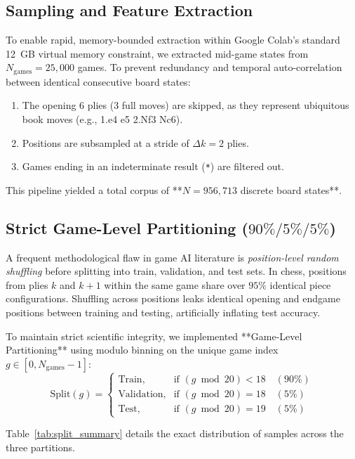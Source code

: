 \documentclass[10pt,journal,compsoc]{IEEEtran}
\begin{document}
\subsection{Sampling and Feature Extraction}
To enable rapid, memory-bounded extraction within Google Colab's standard 12~GB virtual memory constraint, we extracted mid-game states from $N_{\text{games}} = 25,000$ games. To prevent redundancy and temporal auto-correlation between identical consecutive board states:
\begin{enumerate}
    \item The opening 6 plies ($3$ full moves) are skipped, as they represent ubiquitous book moves (e.g., 1.e4 e5 2.Nf3 Nc6).
    \item Positions are subsampled at a stride of $\Delta k = 2$ plies.
    \item Games ending in an indeterminate result (\texttt{*}) are filtered out.
\end{enumerate}
This pipeline yielded a total corpus of **$N = 956,713$ discrete board states**.

\subsection{Strict Game-Level Partitioning ($90\% / 5\% / 5\%$)}
A frequent methodological flaw in game AI literature is \textit{position-level random shuffling} before splitting into train, validation, and test sets. In chess, positions from plies $k$ and $k+1$ within the same game share over $95\%$ identical piece configurations. Shuffling across positions leaks identical opening and endgame positions between training and testing, artificially inflating test accuracy.

To maintain strict scientific integrity, we implemented **Game-Level Partitioning** using modulo binning on the unique game index $g \in [0, N_{\text{games}}-1]$:
\begin{equation}
\text{Split}(g) = 
\begin{cases} 
\text{Train}, & \text{if } (g \bmod 20) < 18 \quad (90\%) \\
\text{Validation}, & \text{if } (g \bmod 20) = 18 \quad (5\%) \\
\text{Test}, & \text{if } (g \bmod 20) = 19 \quad (5\%)
\end{cases}
\end{equation}

Table~\ref{tab:split_summary} details the exact distribution of samples across the three partitions.
\end{document}
